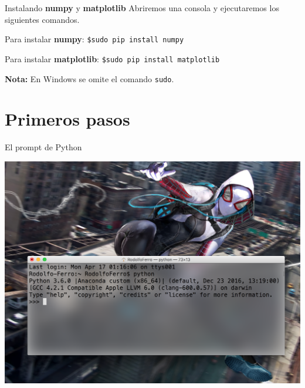\documentclass[usenames,dvipsnames]{beamer}
\begin{document}
  \begin{frame}{Instalando \textbf{numpy} y \textbf{matplotlib}}
    Abriremos una consola y ejecutaremos los siguientes comandos.
    \begin{block}{Para instalar \textbf{numpy}:}
      \texttt{\$\hspace{0.3cm}sudo pip install numpy}
    \end{block}
    \vspace*{0.5cm}
    \begin{block}{Para instalar \textbf{matplotlib}:}
      \texttt{\$\hspace{0.3cm}sudo pip install matplotlib}
    \end{block}
    \textbf{Nota:} En Windows se omite el comando \texttt{sudo}.
  \end{frame}

  \section{Primeros pasos}
  \begin{frame}{El prompt de Python}
    \begin{center}
      \includegraphics[width=1.0\textwidth]{imgs/prompt}
    \end{center}
  \end{frame}
\end{document}
